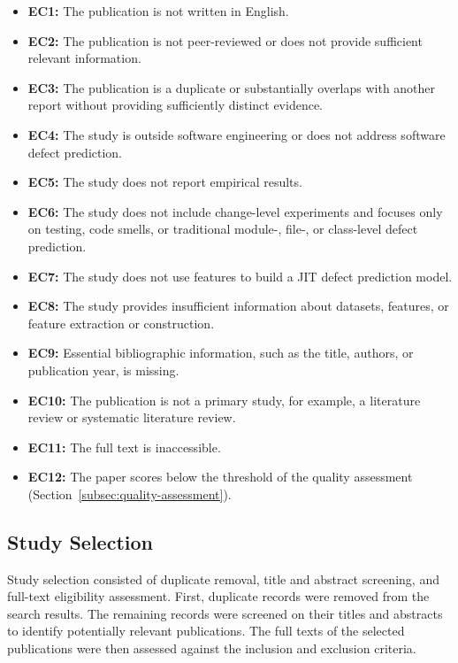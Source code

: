 \documentclass[sigconf,review]{acmart}
\begin{document}
\begin{itemize}
    \item \textbf{EC1:} The publication is not written in English.
    \item \textbf{EC2:} The publication is not peer-reviewed or does not provide sufficient relevant information.
    \item \textbf{EC3:} The publication is a duplicate or substantially overlaps with another report without providing sufficiently distinct evidence.
    \item \textbf{EC4:} The study is outside software engineering or does not address software defect prediction.
    \item \textbf{EC5:} The study does not report empirical results.
    \item \textbf{EC6:} The study does not include change-level experiments and focuses only on testing, code smells, or traditional module-, file-, or class-level defect prediction.
    \item \textbf{EC7:} The study does not use features to build a JIT defect prediction model.
    \item \textbf{EC8:} The study provides insufficient information about datasets, features, or feature extraction or construction.
    \item \textbf{EC9:} Essential bibliographic information, such as the title, authors, or publication year, is missing.
    \item \textbf{EC10:} The publication is not a primary study, for example, a literature review or systematic literature review.
    \item \textbf{EC11:} The full text is inaccessible.
    \item \textbf{EC12:} The paper scores below the threshold of the quality assessment (Section~\ref{subsec:quality-assessment}).
\end{itemize}

\subsection{Study Selection}
\label{subsec:study-selection}

Study selection consisted of duplicate removal, title and abstract screening, and full-text eligibility assessment. First, duplicate records were removed from the search results. The remaining records were screened on their titles and abstracts to identify potentially relevant publications. The full texts of the selected publications were then assessed against the inclusion and exclusion criteria.
\end{document}
